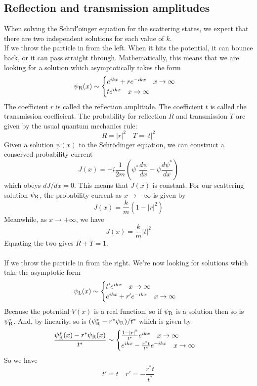 \subsection{Reflection and transmission amplitudes}
When solving the Schrd\''{o}inger equation for the scattering states, we expect that there are two independent solutions for each value of $k$.
\\
If we throw the particle in from the left. When it hits the potential, it can bounce back, or it can pass straight through. 
Mathematically, this means that we are looking for a solution which asymptotically takes the form
\[\psi_{\rm R}(x) \sim \begin{cases} e^{ikx} + re^{-ikx} \quad x \to \infty \\ te^{ikx} \quad x \to \infty \end{cases}\]
The coefficient $r$ is called the reflection amplitude. The coefficient $t$ is called the transmission coefficient. The probability for reflection $R$ and transmission $T$ are given by the usual quantum mechanics rule:
\[R = |r|^2 \quad T = |t|^2\]
Given a solution $\psi(x)$ to the Schrödinger equation, we can construct a conserved probability current
\[J(x) = -i\frac{1}{2m}\left( \psi^*\frac{d\psi}{dx} - \psi\frac{d\psi^*}{dx}\right)\]
which obeys $dJ/dx = 0$. This means that $J(x)$ is constant. For our scattering solution $\psi_{\rm R}$, the probability current as $x\to-\infty$ is given by
\[J(x) = \frac{k}{m}(1-|r|^2)\]
Meanwhile, as $x \to +\infty$, we have
\[J(x) = \frac{k}{m} |t|^2\]
Equating the two gives $R + T =1$.
\\ \\
If we throw the particle in from the right. We're now looking for solutions which take the asymptotic form
\[\psi_{\rm L}(x) \sim \begin{cases} t'e^{ikx}  \quad x \to \infty \\ e^{ikx} + r'e^{-ikx} \quad x \to \infty \end{cases}\]
Because the potential $V (x) $ is a real function, so if $\psi_{\rm R}$ is a solution then so is $\psi^*_{\rm R}$. And, by linearity, so is $(\psi^*_{\rm R} - r^*\psi_{\rm R}) / t^* $ which is given by
\[\frac{\psi^*_{\rm R}(x) - r^*\psi_{\rm R}(x)}{t^*} \sim \begin{cases} \frac{1-|r|^2}{t^*} e^{ikx}  \quad x \to \infty \\ e^{ikx} - \frac{r^* t}{t^*}e^{-ikx} \quad x \to \infty \end{cases}\]
So we have
\[t' = t \quad r' = -\frac{r^* t}{t^*}\]

